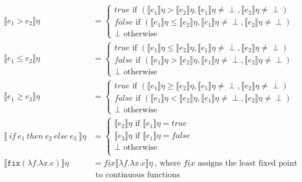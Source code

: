\documentclass{westhesis}
\begin{document}
\begin{align*}
 \\
  \llbracket e_1 > e_2 \rrbracket\eta &= 
 \begin{cases} 
      true \text{ if } (\llbracket e_1 \rrbracket\eta > \llbracket e_2 \rrbracket\eta, \llbracket e_1 \rrbracket\eta \neq \perp, \llbracket e_2 \rrbracket\eta \neq \perp) \\
      false \text{  if } (\llbracket e_1 \rrbracket\eta \leq \llbracket e_2\rrbracket\eta, \llbracket e_1 \rrbracket\eta \neq \perp, \llbracket e_2 \rrbracket\eta \neq \perp)\\
      \perp \text{ otherwise}
   \end{cases}
 \\
  \llbracket e_1 \leq e_2 \rrbracket\eta &= 
 \begin{cases} 
      true \text{ if } (\llbracket e_1 \rrbracket\eta \leq \llbracket e_2 \rrbracket\eta, \llbracket e_1 \rrbracket\eta \neq \perp, \llbracket e_2 \rrbracket\eta \neq \perp) \\
      false \text{  if } (\llbracket e_1 \rrbracket\eta > \llbracket e_2\rrbracket\eta, \llbracket e_1 \rrbracket\eta \neq \perp, \llbracket e_2 \rrbracket\eta \neq \perp)\\
      \perp \text{ otherwise}
   \end{cases}
 \\
  \llbracket e_1 \geq e_2 \rrbracket\eta &= 
 \begin{cases} 
      true \text{ if } (\llbracket e_1 \rrbracket\eta \geq \llbracket e_2 \rrbracket\eta, \llbracket e_1 \rrbracket\eta \neq \perp, \llbracket e_2 \rrbracket\eta \neq \perp) \\
      false \text{  if } (\llbracket e_1 \rrbracket\eta < \llbracket e_2\rrbracket\eta, \llbracket e_1 \rrbracket\eta \neq \perp, \llbracket e_2 \rrbracket\eta \neq \perp)\\
      \perp \text{ otherwise}
   \end{cases}
 \\
  \llbracket \ if \ e_1 \ then \ e_2 \ else \ e_3 \ \rrbracket \eta &= 
 \begin{cases} 
      \llbracket e_2 \rrbracket\eta \text{ if } \llbracket e_1 \rrbracket\eta = true \\
      \llbracket e_3 \rrbracket\eta \text{ if } \llbracket e_1 \rrbracket\eta = false \\
      \perp \text{      otherwise} \\
   \end{cases}
  \\
   \llbracket  \texttt{fix} (\lambda f.\lambda x.e) \rrbracket\eta &= \underline{fix}\llbracket \lambda f.\lambda x.e \rrbracket\eta \
 \text{, where } \underline{fix} \text{ assigns the least fixed point} \\ 
 &\text{ \ \ \ \ \ \ \ \ \ \ \ \ \ \ \ \ \ \ \ \ \ \ \ to continuous functions} \\
 \end{align*}
\end{document}
